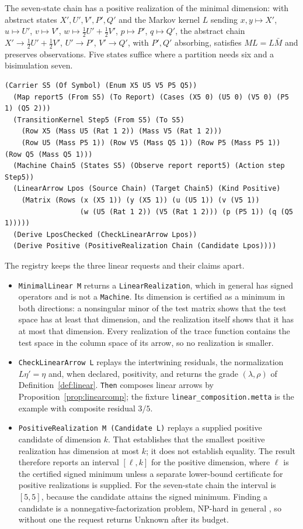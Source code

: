 \documentclass[11pt]{article}
\newcommand{\code}[1]{\texttt{#1}}
\theoremstyle{definition}
\theoremstyle{plain}
\begin{document}
The seven-state chain has a positive realization of the minimal dimension: with abstract states
$X',U',V',P',Q'$ and the Markov kernel $L$ sending $x,y\mapsto X'$, $u\mapsto U'$, $v\mapsto V'$,
$w\mapsto\tfrac12U'+\tfrac12V'$, $p\mapsto P'$, $q\mapsto Q'$, the abstract chain
$X'\to\tfrac12U'+\tfrac12V'$, $U'\to P'$, $V'\to Q'$, with $P',Q'$ absorbing, satisfies
$ML=L\bar M$ and preserves observations. Five states suffice where a partition needs six and a
bisimulation seven.
\begin{lstlisting}[basicstyle=\ttfamily\footnotesize,title={\scriptsize\ttfamily fixtures/seven\_state.metta}]
  (Carrier S5 (Of Symbol) (Enum X5 U5 V5 P5 Q5))
  (Map report5 (From S5) (To Report) (Cases (X5 0) (U5 0) (V5 0) (P5 1) (Q5 2)))
  (TransitionKernel Step5 (From S5) (To S5)
    (Row X5 (Mass U5 (Rat 1 2)) (Mass V5 (Rat 1 2)))
    (Row U5 (Mass P5 1)) (Row V5 (Mass Q5 1)) (Row P5 (Mass P5 1)) (Row Q5 (Mass Q5 1)))
  (Machine Chain5 (States S5) (Observe report report5) (Action step Step5))
  (LinearArrow Lpos (Source Chain) (Target Chain5) (Kind Positive)
    (Matrix (Rows (x (X5 1)) (y (X5 1)) (u (U5 1)) (v (V5 1))
                  (w (U5 (Rat 1 2)) (V5 (Rat 1 2))) (p (P5 1)) (q (Q5 1)))))
  (Derive LposChecked (CheckLinearArrow Lpos))
  (Derive Positive (PositiveRealization Chain (Candidate Lpos))))
\end{lstlisting}
The registry keeps the three linear requests and their claims apart.
\begin{itemize}
\item \code{MinimalLinear M} returns a \code{LinearRealization}, which in general has signed
operators and is not a \code{Machine}. Its dimension is certified as a minimum in both directions:
a nonsingular minor of the test matrix shows that the test space has at least that dimension, and
the realization itself shows that it has at most that dimension. Every realization of the trace
function contains the test space in the column space of its arrow, so no realization is smaller.
\item \code{CheckLinearArrow L} replays the intertwining residuals, the normalization
$L\eta'=\eta$ and, when declared, positivity, and returns the grade $(\lambda,\rho)$ of
Definition~\ref{def:linear}. \code{Then} composes linear arrows by
Proposition~\ref{prop:linearcomp}; the fixture \code{linear\_composition.metta} is the example with
composite residual $3/5$.
\item \code{PositiveRealization M (Candidate L)} replays a supplied positive candidate of dimension
$k$. That establishes that the smallest positive realization has dimension at most $k$; it does
not establish equality. The result therefore reports an interval $[\ell,k]$ for the positive
dimension, where $\ell$ is the certified signed minimum unless a separate lower-bound certificate
for positive realizations is supplied. For the seven-state chain the interval is $[5,5]$, because
the candidate attains the signed minimum. Finding a candidate is a nonnegative-factorization
problem, NP-hard in general \cite{vavasis}, so without one the request returns Unknown after its
budget.
\end{itemize}
\end{document}
